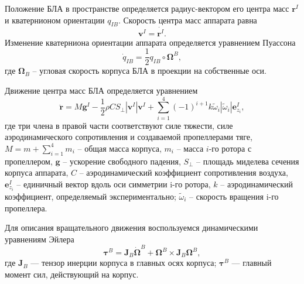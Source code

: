 Положение БЛА в пространстве определяется радиус-вектором его центра масс $\bm{r}^I$ и кватернионом ориентации $q_{IB}$. Скорость центра масс аппарата равна
\begin{equation} \label{eq:m_vel}
\bm{v}^I = \dot{\bm{r}^I}.
\end{equation}
Изменение кватерниона ориентации аппарата определяется уравнением Пуассона
\begin{equation} \label{eq:m_puasson}
\dot{q}_{IB} = \frac{1}{2} {q}_{IB} \circ \bm{\Omega}^B,
\end{equation}
где $\bm{\Omega}_B$ – угловая скорость корпуса БЛА в проекции на собственные оси.

Движение центра масс БЛА определяется уравнением
\begin{equation} \label{eq:m_traslational_motion}
\ddot{\bm{r}} = M \bm{g}^I - \frac{1}{2} \rho C S_{\perp} |\bm{v}^I| \bm{v}^I + \sum_{i=1}^{4}{ { (-1)^{i+1} k \tilde \omega_i |\tilde \omega_i| \bm{e}^I_{z_i}}},
\end{equation}
где три члена в правой части соответствуют силе тяжести, силе аэродинамического сопротивления и создаваемой пропеллерами тяге, $M = m + \sum_{i=1}^{4}{m_i}$ – общая масса корпуса, $m_i$ – масса $i$-го ротора с пропеллером, $\bm g$ – ускорение свободного падения, $S_{\perp}$ – площадь миделева сечения корпуса аппарата, $C$ – аэродинамический коэффициент сопротивления воздуха, $\bm{e}^I_{z_i}$ – единичный вектор вдоль оси симметрии i-го ротора, $k$ – аэродинамический коэффициент, определяемый экспериментально; $\tilde \omega_i$ – скорость вращения i-го пропеллера.

Для описания вращательного движения воспользуемся динамическими уравнениям Эйлера
\begin{equation} \label{eq:m_rotational_motion}
\bm{\tau}^{B} =
\bm{J}_B\dot{\bm{\Omega}}^B + \bm{\Omega}^B \times \bm{J}_B{\bm{\Omega}^B},
\end{equation}
где $\bm{J}_B$ — тензор инерции корпуса в главных осях корпуса; $\bm{\tau}^{B}$ —
главный момент сил, действующий на корпус.

